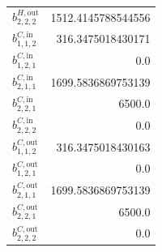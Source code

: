 \documentclass{article}%
\begin{document}
\begin{multicols*}{3}
\begin{supertabular}{lr}
	$b_{2,2,2}^{H,\text{out}}$ & 1512.4145788544556 \\%
	$b_{1,1,2}^{C,\text{in}}$ & 316.3475018430171 \\%
	$b_{1,2,1}^{C,\text{in}}$ & 0.0 \\%
	$b_{2,1,1}^{C,\text{in}}$ & 1699.5836869753139 \\%
	$b_{2,2,1}^{C,\text{in}}$ & 6500.0 \\%
	$b_{2,2,2}^{C,\text{in}}$ & 0.0 \\%
	$b_{1,1,2}^{C,\text{out}}$ & 316.3475018430163 \\%
	$b_{1,2,1}^{C,\text{out}}$ & 0.0 \\%
	$b_{2,1,1}^{C,\text{out}}$ & 1699.5836869753139 \\%
	$b_{2,2,1}^{C,\text{out}}$ & 6500.0 \\%
	$b_{2,2,2}^{C,\text{out}}$ & 0.0 \\%
\end{supertabular}%
\end{multicols*}%
\end{document}
